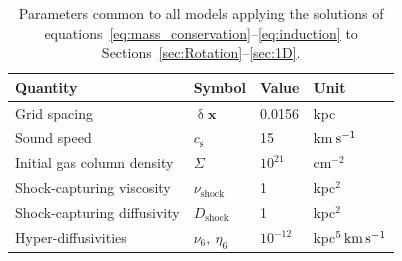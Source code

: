 \documentclass[fleqn,usenatbib]{mnras}
\newcommand\sound{_\text{s}} %
\renewcommand\vec[1]{\bm{#1}}%
\newcommand{\km}{\,{\rm km}}    %
\newcommand{\s}{\,{\rm s}}      %
\newcommand{\kms}{\km\s^{-1}}    %
\begin{document}
\begin{table}
\caption{
Parameters common to all models applying the %
solutions of
equations~\eqref{eq:mass_conservation}--\eqref{eq:induction} to %
Sections~\ref{sec:Rotation}--\ref{sec:1D}.
\label{tab:parameter_values}
}
\centering
\begin{tabular}{llll}
\hline
Quantity                   & Symbol          & Value           &Unit     \\
\hline
Grid spacing            & $\updelta\vec{x}$  & 0.0156          &kpc \\
Sound speed                 & $c\sound$          & 15          &km$\s^{-1}$ \\
Initial gas column density  &$\Sigma$            & $10^{21}$   & cm$^{-2}$\\
Shock-capturing viscosity   & $\nu_\text{shock}$ & 1           & kpc$^{2}$\\
Shock-capturing diffusivity & $D_\text{shock}$   & 1           & kpc$^{2}$\\
Hyper-diffusivities & $\nu_6,\ \eta_6$  & $10^{-12}$ &kpc$^{5}\kms$\\
\hline
\end{tabular}
\end{table}
\end{document}

